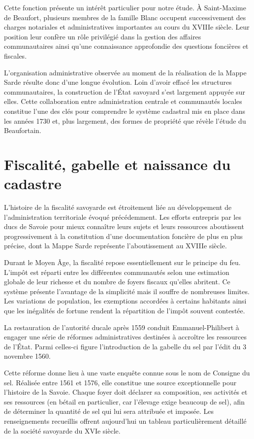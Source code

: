 \documentclass[12pt,a4paper]{report}
\begin{document}
\vspace{1em}

Cette fonction présente un intérêt particulier pour notre étude. À Saint-Maxime de Beaufort, plusieurs membres de la famille Blanc occupent successivement des charges notariales et administratives importantes au cours du XVIIIe siècle. Leur position leur confère un rôle privilégié dans la gestion des affaires communautaires ainsi qu'une connaissance approfondie des questions foncières et fiscales.

L'organisation administrative observée au moment de la réalisation de la Mappe Sarde résulte donc d'une longue évolution. Loin d'avoir effacé les structures communautaires, la construction de l'État savoyard s'est largement appuyée sur elles. Cette collaboration entre administration centrale et communautés locales constitue l'une des clés pour comprendre le système cadastral mis en place dans les années 1730 et, plus largement, des formes de propriété que révèle l'étude du Beaufortain.

\section{Fiscalité, gabelle et naissance du cadastre}

L'histoire de la fiscalité savoyarde est étroitement liée au développement de l'administration territoriale évoqué précédemment. Les efforts entrepris par les ducs de Savoie pour mieux connaître leurs sujets et leurs ressources aboutissent progressivement à la constitution d'une documentation foncière de plus en plus précise, dont la Mappe Sarde représente l'aboutissement au XVIIIe siècle.

Durant le Moyen Âge, la fiscalité repose essentiellement sur le principe du feu. L'impôt est réparti entre les différentes communautés selon une estimation globale de leur richesse et du nombre de foyers fiscaux qu'elles abritent. Ce système présente l'avantage de la simplicité mais il souffre de nombreuses limites. Les variations de population, les exemptions accordées à certains habitants ainsi que les inégalités de fortune rendent la répartition de l'impôt souvent contestée.

La restauration de l'autorité ducale après 1559 conduit Emmanuel-Philibert à engager une série de réformes administratives destinées à accroître les ressources de l'État. Parmi celles-ci figure l'introduction de la gabelle du sel par l'édit du 3 novembre 1560.

Cette réforme donne lieu à une vaste enquête connue sous le nom de Consigne du sel. Réalisée entre 1561 et 1576, elle constitue une source exceptionnelle pour l'histoire de la Savoie. Chaque foyer doit déclarer sa composition, ses activités et ses ressources (en bétail en particulier, car l'élevage exige beaucoup de sel), afin de déterminer la quantité de sel qui lui sera attribuée et imposée. Les renseignements recueillis offrent aujourd'hui un tableau particulièrement détaillé de la société savoyarde du XVIe siècle.
\end{document}
